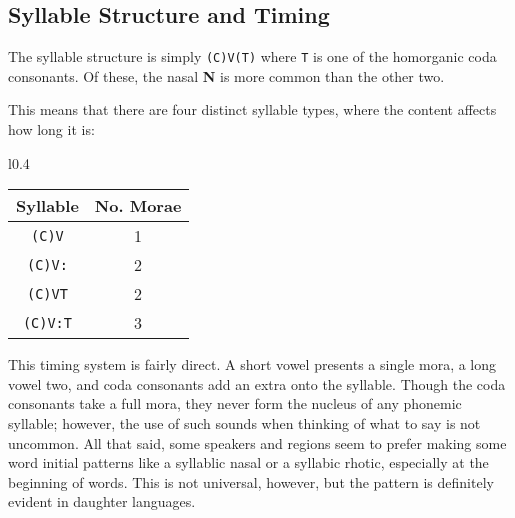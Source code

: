   \subsection{Syllable Structure and Timing}
  The syllable structure is simply \texttt{(C)V(T)} where \texttt{T} is one of the homorganic coda consonants. Of these, the nasal \textbf{N} is more common than the other two.\par
  This means that there are four distinct syllable types, where the content affects how long it is:\par
  \vspace{4mm}
  \begin{wrapfigure}{l}{0.4\textwidth}
    \begin{tabular}{|c|c|}
      \hline
      Syllable        & No. Morae \\ \hline \hline
      \texttt{(C)V}   & 1         \\
      \texttt{(C)V:}  & 2         \\
      \texttt{(C)VT}  & 2         \\ 
      \texttt{(C)V:T} & 3         \\ \hline
    \end{tabular}
  \end{wrapfigure} 
  This timing system is fairly direct. A short vowel presents a single mora, a long vowel two, and coda consonants add an extra onto the syllable. Though the coda consonants take a full mora, they never form the nucleus of any phonemic syllable; however, the use of such sounds when thinking of what to say is not uncommon. All that said, some speakers and regions seem to prefer making some word initial patterns like  a syllablic nasal or  a syllabic rhotic, especially at the beginning of words. This is not universal, however, but the pattern is definitely evident in daughter languages.\par

